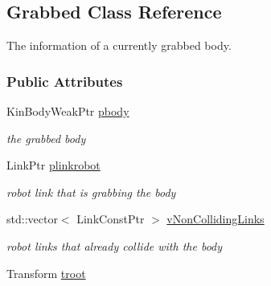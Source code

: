 \hypertarget{classOpenRAVE_1_1RobotBase_1_1Grabbed}{
\subsection{Grabbed Class Reference}
\label{classOpenRAVE_1_1RobotBase_1_1Grabbed}
}


The information of a currently grabbed body.  


\subsubsection*{Public Attributes}
\begin{DoxyCompactItemize}
\item 
\hypertarget{classOpenRAVE_1_1RobotBase_1_1Grabbed_a8b4ce70056acd56ee57c2907fba4f0a7}{
KinBodyWeakPtr \hyperlink{classOpenRAVE_1_1RobotBase_1_1Grabbed_a8b4ce70056acd56ee57c2907fba4f0a7}{pbody}}
\label{classOpenRAVE_1_1RobotBase_1_1Grabbed_a8b4ce70056acd56ee57c2907fba4f0a7}

\begin{DoxyCompactList}\small\item\em the grabbed body \item\end{DoxyCompactList}\item 
\hypertarget{classOpenRAVE_1_1RobotBase_1_1Grabbed_a76161751334f832eef6c40dc13da705f}{
LinkPtr \hyperlink{classOpenRAVE_1_1RobotBase_1_1Grabbed_a76161751334f832eef6c40dc13da705f}{plinkrobot}}
\label{classOpenRAVE_1_1RobotBase_1_1Grabbed_a76161751334f832eef6c40dc13da705f}

\begin{DoxyCompactList}\small\item\em robot link that is grabbing the body \item\end{DoxyCompactList}\item 
\hypertarget{classOpenRAVE_1_1RobotBase_1_1Grabbed_a5c367c3a637ef9778667fb00efdfaad7}{
std::vector$<$ LinkConstPtr $>$ \hyperlink{classOpenRAVE_1_1RobotBase_1_1Grabbed_a5c367c3a637ef9778667fb00efdfaad7}{vNonCollidingLinks}}
\label{classOpenRAVE_1_1RobotBase_1_1Grabbed_a5c367c3a637ef9778667fb00efdfaad7}

\begin{DoxyCompactList}\small\item\em robot links that already collide with the body \item\end{DoxyCompactList}\item 
\hypertarget{classOpenRAVE_1_1RobotBase_1_1Grabbed_a4603d447a8a0a8105a15f198626977ef}{
Transform \hyperlink{classOpenRAVE_1_1RobotBase_1_1Grabbed_a4603d447a8a0a8105a15f198626977ef}{troot}}
\label{classOpenRAVE_1_1RobotBase_1_1Grabbed_a4603d447a8a0a8105a15f198626977ef}


\end{DoxyCompactItemize}

